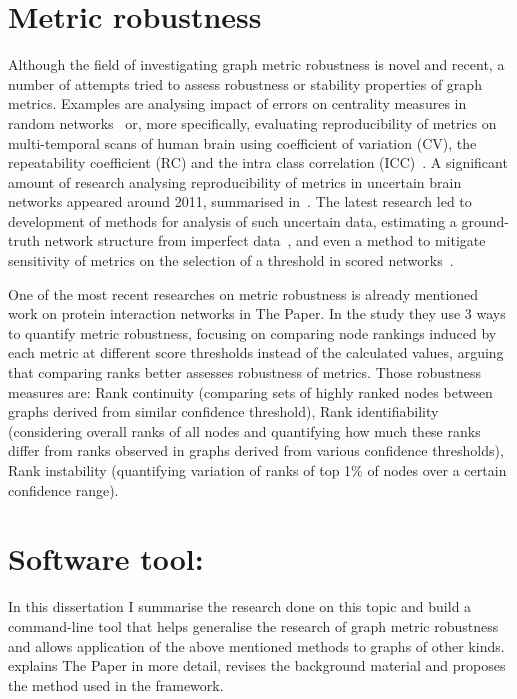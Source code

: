 \section{Metric robustness}

Although the field of investigating graph metric robustness is novel and recent, a number of attempts tried to assess robustness or stability properties of graph metrics.
Examples are analysing impact of errors on centrality measures in random networks~\cite{BorgattiRobustnessCentralityMeasures2006} or, more specifically, evaluating reproducibility of metrics on multi-temporal scans of human brain using coefficient of variation (CV), the repeatability coefficient (RC) and the intra class correlation (ICC)~\cite{VaessenEffectReproducibilityDifferent2010,DennisTestRetestReliabilityGraph2012}.
A significant amount of research analysing reproducibility of metrics in uncertain brain networks appeared around 2011, summarised in~\cite{TelesfordExplorationGraphMetric2013}.
The latest research led to development of methods for analysis of such uncertain data, estimating a ground-truth network structure from imperfect data~\cite{Martin2016,Newman2018}, and even a method to mitigate sensitivity of metrics on the selection of a threshold in scored networks~\cite{Drakesmith2015}.

One of the most recent researches on metric robustness is already mentioned work on protein interaction networks in The Paper.
In the study they use 3 ways to quantify metric robustness, focusing on comparing node rankings induced by each metric at different score thresholds instead of the calculated values, arguing that comparing ranks better assesses robustness of metrics.
Those robustness measures are: Rank continuity (comparing sets of highly ranked nodes between graphs derived from similar confidence threshold), Rank identifiability (considering overall ranks of all nodes and quantifying how much these ranks differ from ranks observed in graphs derived from various confidence thresholds), Rank instability (quantifying variation of ranks of top 1\% of nodes over a certain confidence range).


\section{Software tool: \graffs}


In this dissertation I summarise the research done on this topic and build a command-line tool that helps generalise the research of graph metric robustness and allows application of the above mentioned methods to graphs of other kinds.
 explains The Paper in more detail, revises the background material and proposes the method used in the framework.


